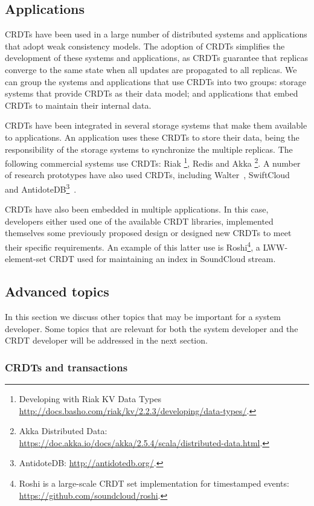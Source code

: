 \documentclass[11pt,a4paper]{article}
\begin{document}
\subsection{Applications}

CRDTs have been used in a large number of distributed systems and applications
that adopt weak consistency models. 
The adoption of CRDTs simplifies the development of these systems and applications, 
as CRDTs guarantee that replicas converge to the same state when all updates are 
propagated to all replicas.
We can group the systems and applications that use CRDTs into two groups: storage
systems that provide CRDTs as their data model; and applications that embed CRDTs
to maintain their internal data.

CRDTs have been integrated in several storage systems that make them available 
to applications.
An application uses these CRDTs to store their data, being the responsibility of 
the storage systems to synchronize the multiple replicas.
The following commercial systems use CRDTs: Riak \footnote{Developing with Riak KV 
Data Types \url{http://docs.basho.com/riak/kv/2.2.3/developing/data-types/}.}, Redis \cite{rediscrdts} and Akka \footnote{Akka Distributed Data: \url{https://doc.akka.io/docs/akka/2.5.4/scala/distributed-data.html}.}.
A number of research prototypes have also used CRDTs, including Walter~\cite{Sovran11Transactional},
SwiftCloud~\cite{swiftcloud} and AntidoteDB\footnote{AntidoteDB: \url{http://antidotedb.org/}.}~\cite{Akkoorath16Cure}.

CRDTs have also been embedded in multiple applications. 
In this case, developers either used one of the available CRDT libraries,
implemented themselves some previously proposed design or designed new
CRDTs to meet their specific requirements. 
An example of this latter use is Roshi\footnote{Roshi is a large-scale CRDT set implementation for timestamped events: \url{https://github.com/soundcloud/roshi}.}, a LWW-element-set CRDT used 
for maintaining an index in SoundCloud stream.


\subsection{Advanced topics}

In this section we discuss other topics that may be important for a 
system developer. Some topics that are relevant for both the system developer
and the CRDT developer will be addressed in the next section.

\subsubsection{CRDTs and transactions}\label{sec:sysdev:adv:tx}
\end{document}
